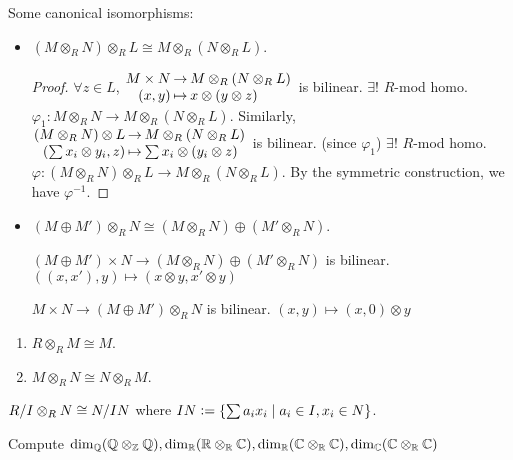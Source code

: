 Some canonical isomorphisms:
\begin{itemize}
  \item $(M \otimes_R N) \otimes_R L \cong M \otimes_R (N \otimes_R L)$.
    \begin{proof}
      $\forall z \in L$, 
      $\arraycolsep=1pt
      \begin{array}{rcl}
        M \times N & \to & M \otimes_R (N \otimes_R L) \\
        (x, y) & \mapsto & x \otimes (y \otimes z)
      \end{array}$ is bilinear.
      $\exists!$ $R$-mod homo.
      $\varphi_1: M \otimes_R N \to M\otimes_R(N\otimes_R L)$.
      Similarly,
      $\arraycolsep=1pt
      \begin{array}{rcl}
        (M \otimes_R N) \otimes L & \to & M \otimes_R (N \otimes_R L) \\
        \left(\sum x_i\otimes y_i, z\right) & \mapsto &
        \sum x_i \otimes (y_i \otimes z)
      \end{array}$ is bilinear. (since $\varphi_1$)
      $\exists!$ $R$-mod homo.
      $\varphi: (M \otimes_R N) \otimes_R L \to M \otimes_R (N \otimes_R L)$.
      By the symmetric construction, we have $\varphi^{-1}$.
    \end{proof}
  \item $(M \oplus M') \otimes_R N \cong (M \otimes_R N)\oplus(M'\otimes_R N)$.

    $(M \oplus M') \times N \to (M \otimes_R N)\oplus(M'\otimes_R N)$ is
    bilinear. $((x, x'), y) \mapsto (x\otimes y, x'\otimes y)$

    $M \times N \to (M \oplus M') \otimes_R N$ is bilinear.
    $(x, y) \mapsto (x, 0) \otimes y$
\end{itemize}

\begin{exercise}\mbox{}
  \begin{enumerate}
    \item $R \otimes_R M \cong M$.
    \item $M \otimes_R N \cong N \otimes_R M$.
  \end{enumerate}
\end{exercise}

\begin{exercise}
  ${R}/{I} \otimes_R N \cong {N}/{IN}$ where
  $IN \vcentcolon= \left\{ \sum a_ix_i \mid a_i \in I, x_i \in N \right\}$.
\end{exercise}

\begin{exercise}
  Compute
  $
  \dim_{\mathbb{Q}} (\mathbb{Q} \otimes_{\mathbb{Z}} \mathbb{Q}), 
  \dim_{\mathbb{R}} (\mathbb{R} \otimes_{\mathbb{R}} \mathbb{C}), 
  \dim_{\mathbb{R}} (\mathbb{C} \otimes_{\mathbb{R}} \mathbb{C}), 
  \dim_{\mathbb{C}} (\mathbb{C} \otimes_{\mathbb{R}} \mathbb{C})
  $
\end{exercise}
